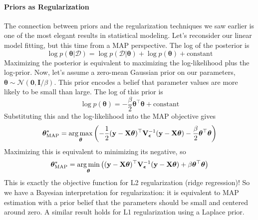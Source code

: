 \paragraph*{Priors as Regularization}
The connection between priors and the regularization techniques we saw earlier is one of the most elegant results in statistical modeling. Let's reconsider our linear model fitting, but this time from a MAP perspective. The log of the posterior is
\begin{equation}
\log p(\boldsymbol{\theta}|\mathcal{D}) = \log p(\mathcal{D}|\boldsymbol{\theta}) + \log p(\boldsymbol{\theta}) + \text{constant} \end{equation}
Maximizing the posterior is equivalent to maximizing the log-likelihood plus the log-prior. Now, let's assume a zero-mean Gaussian prior on our parameters, $\boldsymbol{\theta} \sim \mathcal{N}(\mathbf{0}, \mathbf{I}/\beta)$. This prior encodes a belief that parameter values are more likely to be small than large. The log of this prior is
\begin{equation}
    \log p(\boldsymbol{\theta}) = -\frac{\beta}{2}\boldsymbol{\theta}^\top\boldsymbol{\theta} + \text{constant}
\end{equation}
Substituting this and the log-likelihood into the MAP objective gives
\begin{equation}
    \boldsymbol{\theta}_{\text{MAP}}^* = \operatorname*{arg\,max}_{\boldsymbol{\theta}} \left( -\frac{1}{2}(\mathbf{y} - \mathbf{X}\boldsymbol{\theta})^\top \mathbf{V}_{\boldsymbol{\epsilon}}^{-1}(\mathbf{y} - \mathbf{X}\boldsymbol{\theta}) - \frac{\beta}{2}\boldsymbol{\theta}^\top\boldsymbol{\theta} \right)
\end{equation}
Maximizing this is equivalent to minimizing its negative, so
\begin{equation}
    \boldsymbol{\theta}_{\text{MAP}}^* = \operatorname*{arg\,min}_{\boldsymbol{\theta}} \left( (\mathbf{y} - \mathbf{X}\boldsymbol{\theta})^\top \mathbf{V}_{\boldsymbol{\epsilon}}^{-1}(\mathbf{y} - \mathbf{X}\boldsymbol{\theta}) + \beta\boldsymbol{\theta}^\top\boldsymbol{\theta} \right)
\end{equation}
This is exactly the objective function for L2 regularization (ridge regression)! So we have a Bayesian interpretation for regularization: it is equivalent to MAP estimation with a prior belief that the parameters should be small and centered around zero. A similar result holds for L1 regularization using a Laplace prior.

